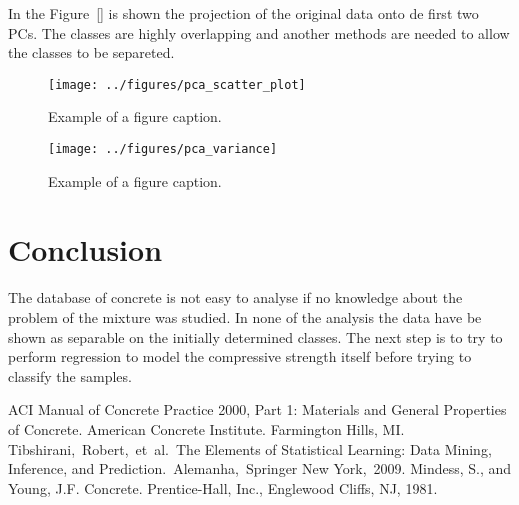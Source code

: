 \documentclass[conference]{IEEEtran}
\begin{document}
In the Figure~[] is shown the projection of the original data onto de first two PCs. The classes are highly overlapping and another methods are needed to allow the classes to be separeted.

\begin{figure}[htbp]
\centerline{\texttt{[image: ../figures/pca\_scatter\_plot]}}
\caption{Example of a figure caption.}
\end{figure}

\begin{figure}[htbp]
\centerline{\texttt{[image: ../figures/pca\_variance]}}
\caption{Example of a figure caption.}
\end{figure}

\section{Conclusion}\label{conclusions}

The database of concrete is not easy to analyse if no knowledge about the problem of the mixture was studied. In none of the analysis the data have be shown as separable on the initially determined classes. The next step is to try to perform regression to model the compressive strength itself before trying to classify the samples.

\begin{thebibliography}{00}
 ACI Manual of Concrete Practice 2000, Part 1: Materials and General Properties of Concrete.  American Concrete Institute.  Farmington Hills, MI.
 Tibshirani, Robert, et al. The Elements of  Statistical Learning:  Data Mining, Inference, and Prediction. Alemanha, Springer New York, 2009.
 Mindess, S., and Young, J.F. Concrete. Prentice-Hall, Inc., Englewood Cliffs, NJ, 1981.
\end{thebibliography}
\end{document}
